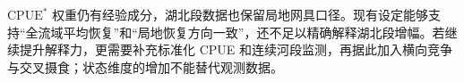 $\mathrm{CPUE}^*$ 权重仍有经验成分，湖北段数据也保留局地网具口径。现有设定能够支持“全流域平均恢复”和“局地恢复方向一致”，还不足以精确解释湖北段增幅。若继续提升解释力，更需要补充标准化 CPUE 和连续河段监测，再据此加入横向竞争与交叉摄食；状态维度的增加不能替代观测数据。
